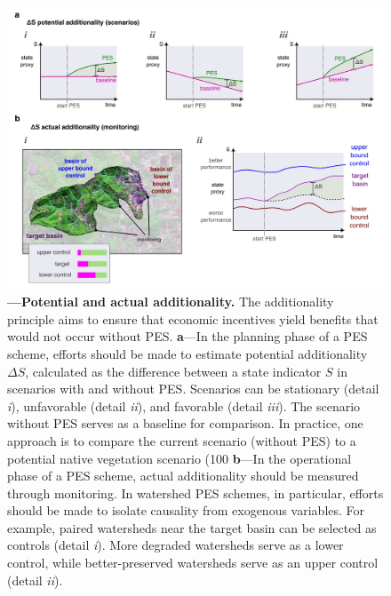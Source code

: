 \documentclass[./main_en.tex]{subfiles}
\begin{document}
\begin{figure}[t!] 
\centering				
\includegraphics[width=0.98\linewidth]{figs/fig_add_en.jpg}		
\caption[Potential and actual additionality.]
{\textbf{---\;Potential and actual additionality.}
    The additionality principle aims to ensure that economic incentives yield benefits that would not occur without PES.
    \;\textbf{a}\;---\;In the planning phase of a PES scheme, efforts should be made to estimate potential additionality $\Delta S$, calculated as the difference between a state indicator $S$ in scenarios with and without PES. Scenarios can be stationary (detail \textrm{\textit{i}}), unfavorable (detail \textrm{\textit{ii}}), and favorable (detail \textrm{\textit{iii}}). The scenario without PES serves as a baseline for comparison. In practice, one approach is to compare the current scenario (without PES) to a potential native vegetation scenario (100%
    \;\textbf{b}\;---\;In the operational phase of a PES scheme, actual additionality should be measured through monitoring. In watershed PES schemes, in particular, efforts should be made to isolate causality from exogenous variables. For example, paired watersheds near the target basin can be selected as controls (detail \textrm{\textit{i}}). More degraded watersheds serve as a lower control, while better-preserved watersheds serve as an upper control (detail \textrm{\textit{ii}}).    
}
\label{fig:eco:add} 		
\end{figure}
\end{document}
